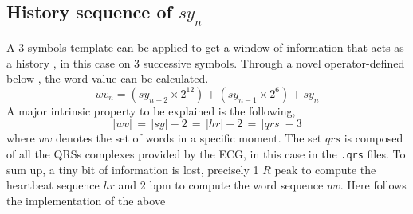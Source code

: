 \subsection{History sequence of $sy_n$}
A 3-symbols template can be applied to get a window of information that acts as a history , in this case on 3 successive symbols. Through a novel operator-defined below \cite[p. 3]{zhou2015}, the word value can be calculated. 
\begin{equation}
wv_n = (sy_{n-2} \times 2^{12}) + (sy_{n-1} \times 2^{6}) + sy_n
\end{equation}
A major intrinsic property to be explained is the following,
\begin{equation}
|wv| \, = \, |sy| - 2 \, = \, |hr| - 2 \, = \, |qrs| - 3  
\end{equation}
where $wv$ denotes the set of words in a specific moment. The set $qrs$ is composed of all the QRSs complexes provided by the ECG, in this case in the \verb|.qrs| files. To sum up, a tiny bit of information is lost, precisely 1 $R$ peak to compute the heartbeat sequence $hr$ and 2 bpm to compute the word sequence $wv$. Here follows the implementation of the above

